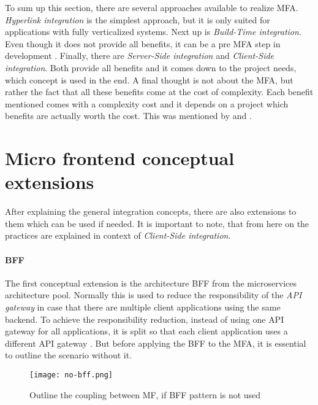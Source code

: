 To sum up this section, there are several approaches available to realize \ac{MFA}.
\textit{Hyperlink integration} is the simplest approach, but it is only suited for applications with fully verticalized systems.
Next up is \textit{Build-Time integration}.
Even though it does not provide all benefits, it can be a pre \ac{MFA} step in development \cite{Vogel.2020.Olleck}.
Finally, there are \textit{Server-Side integration} and \textit{Client-Side integration}.
Both provide all benefits and it comes down to the project needs, which concept is used in the end.
A final thought is not about the \ac{MFA}, but rather the fact that all these benefits come at the cost of complexity.
Each benefit mentioned comes with a complexity cost and it depends on a project which benefits are actually worth the cost.
This was mentioned by \textcite{Leitner.2020} and \textcite{Jackson.2019}.





\section{Micro frontend conceptual extensions}

After explaining the general integration concepts, there are also extensions to them which can be used if needed.
It is important to note, that from here on the practices are explained in context of \textit{Client-Side integration}.



\paragraph{\acl{BFF}}\label{cha:theory_extensions_bff}

The first conceptual extension is the architecture \acf{BFF} from the microservices architecture pool.
Normally this is used to reduce the responsibility of the \textit{\ac{API} gateway} in case that there are multiple client applications using the same backend.
To achieve the responsibility reduction, instead of using one \ac{API} gateway for all applications, it is split so that each client application uses a different \ac{API} gateway \cite[p.~69f.]{Bruce.2019}.
But before applying the \ac{BFF} to the \ac{MFA}, it is essential to outline the scenario without it.

\begin{figure}[h]
    \centering
    \texttt{[image: no-bff.png]}
    \caption{Outline the coupling between \ac{MF}, if \ac{BFF} pattern is not used \cite{Leitner.2020}}
    \label{img:team_slicing_no_bff}
\end{figure}

